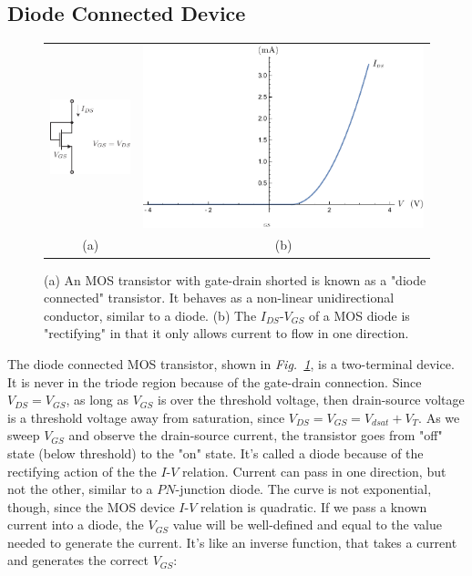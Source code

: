 \subsection{Diode Connected Device}
\begin{figure}[tb]
\centering
\begin{tabular}{cc}
\includegraphics[scale=1]{3mos_diode.pdf} &
\includegraphics[width=.5\columnwidth]{ivrect.pdf}\\
(a) & (b)\\
\end{tabular}
\caption{(a) An MOS transistor with gate-drain shorted is known as a "diode connected" transistor.  It behaves as a non-linear unidirectional conductor, similar to a diode.  (b) The $I_{DS}$-$V_{GS}$ of a MOS diode is "rectifying" in that it only allows current to flow in one direction.}
\label{fig:3mos_diode.pdf}
\end{figure}
The diode connected MOS transistor, shown in \emph{Fig.~\ref{fig:3mos_diode.pdf}}, is a two-terminal device.  It is never in the triode region because of the gate-drain connection.  Since $V_{DS} = V_{GS}$, as long as $V_{GS}$ is over the threshold voltage, then drain-source voltage is a threshold voltage away from saturation, since $V_{DS} = V_{GS} = V_{dsat} + V_T$.  As we sweep $V_{GS}$ and observe the drain-source current, the transistor goes from "off" state (below threshold) to the "on" state.  It's called a diode because of the rectifying action of the the $I$-$V$ relation. Current can pass in one direction, but not the other, similar to a $PN$-junction diode.  The curve is not exponential, though, since the MOS device $I$-$V$ relation is quadratic.  If we pass a known current into a diode, the $V_{GS}$ value will be well-defined and equal to the value needed to generate the current. It's like an inverse function, that takes a current and generates the correct $V_{GS}$:
